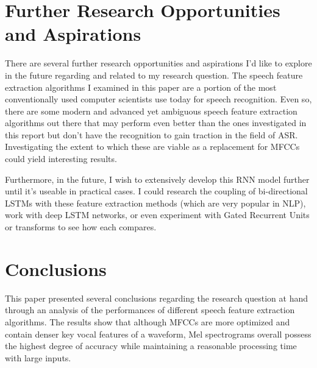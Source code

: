 
\section{Further Research Opportunities and Aspirations}

There are several further research opportunities and aspirations I’d like to explore in the future regarding and related to my research question. The speech feature extraction algorithms I examined in this paper are a portion of the most conventionally used computer scientists use today for speech recognition. Even so, there are some modern and advanced yet ambiguous speech feature extraction algorithms out there that may perform even better than the ones investigated in this report but don’t have the recognition to gain traction in the field of ASR. Investigating the extent to which these are viable as a replacement for MFCCs could yield interesting results. 
\newline\par
Furthermore, in the future, I wish to extensively develop this RNN model further until it’s useable in practical cases. I could research the coupling of bi-directional LSTMs with these feature extraction methods (which are very popular in NLP), work with deep LSTM networks, or even experiment with Gated Recurrent Units or transforms to see how each compares.


\section{Conclusions}

This paper presented several conclusions regarding the research question at hand through an analysis of the performances of different speech feature extraction algorithms. The results show that although MFCCs are more optimized and contain denser key vocal features of a waveform, Mel spectrograms overall possess the highest degree of accuracy while maintaining a reasonable processing time with large inputs.
